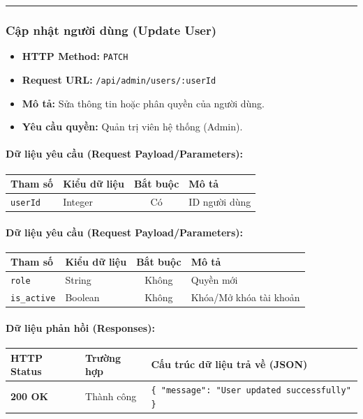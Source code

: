 \documentclass[12pt,a4paper]{article}
\begin{document}
\vskip 0.4cm
\noindent\rule{\textwidth}{0.3pt}
\vskip 0.4cm

\subsubsection{Cập nhật người dùng (Update User)}
\begin{itemize}[leftmargin=*]
    \item \textbf{HTTP Method:} \texttt{PATCH}
    \item \textbf{Request URL:} \texttt{/api/admin/users/:userId}
    \item \textbf{Mô tả:} Sửa thông tin hoặc phân quyền của người dùng.
    \item \textbf{Yêu cầu quyền:} Quản trị viên hệ thống (Admin).
\end{itemize}

\paragraph{Dữ liệu yêu cầu (Request Payload/Parameters):}
\begin{longtable}{|p{2.8cm}|p{2.2cm}|c|p{7.0cm}|}
\hline
\textbf{Tham số} & \textbf{Kiểu dữ liệu} & \textbf{Bắt buộc} & \textbf{Mô tả} \\ \hline
\endhead
\texttt{userId} & Integer & Có & ID người dùng \\ \hline
\end{longtable}

\paragraph{Dữ liệu yêu cầu (Request Payload/Parameters):}
\begin{longtable}{|p{2.8cm}|p{2.2cm}|c|p{7.0cm}|}
\hline
\textbf{Tham số} & \textbf{Kiểu dữ liệu} & \textbf{Bắt buộc} & \textbf{Mô tả} \\ \hline
\endhead
\texttt{role} & String & Không & Quyền mới \\ \hline
\texttt{is\_active} & Boolean & Không & Khóa/Mở khóa tài khoản \\ \hline
\end{longtable}

\paragraph{Dữ liệu phản hồi (Responses):}
\begin{longtable}{|p{2.8cm}|p{3.2cm}|p{8.0cm}|}
\hline
\textbf{HTTP Status} & \textbf{Trường hợp} & \textbf{Cấu trúc dữ liệu trả về (JSON)} \\ \hline
\endhead
\textbf{200 OK} & Thành công & \texttt{\{ "message": "User updated successfully" \}} \\ \hline
\end{longtable}
\end{document}
